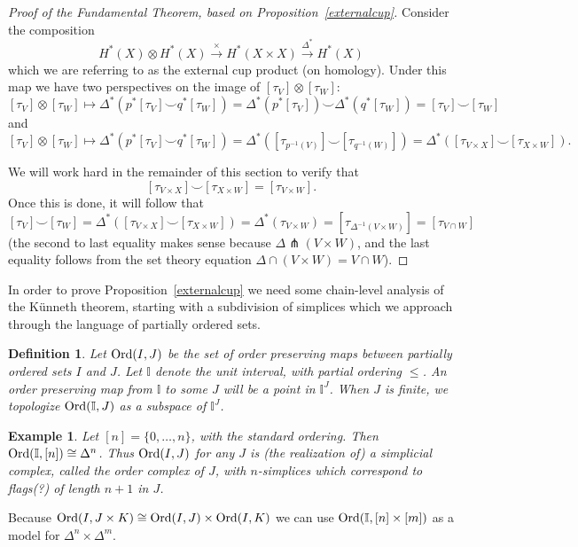 \documentclass{amsart}          %
\newtheorem{definition}[theorem]{Definition}
\newtheorem{example}[theorem]{Example}
\newcommand{\I}{\mathbb I}
\begin{document}
\begin{proof}[Proof of the Fundamental Theorem, based on Proposition~\ref{externalcup}]
Consider the composition 
\[
H^{\ast}(X)\otimes H^{\ast}(X)\xrightarrow{\times} H^{\ast}(X\times X)\xrightarrow{\Delta^*}H^{\ast}(X)
\]
which we are referring to as the external cup product (on homology). Under this map we have two perspectives on the image of $[\tau_V]\otimes[\tau_W]$:
\[
[\tau_V]\otimes[\tau_W]\mapsto \Delta^{\ast}(p^{\ast}[\tau_V]\smile q^{\ast}[\tau_W]) = \Delta^{\ast}(p^{\ast}[\tau_V])\smile\Delta^{\ast}(q^{\ast}[\tau_W]) = [\tau_V]\smile[\tau_W]
\]
and
\[
[\tau_V]\otimes[\tau_W]\mapsto \Delta^{\ast}(p^{\ast}[\tau_V]\smile q^{\ast}[\tau_W]) = \Delta^{\ast}([\tau_{p^{-1}(V)}]\smile [\tau_{q^{-1}(W)}]) = \Delta^{\ast}([\tau_{V\times X}]\smile[\tau_{X\times W}]).
\]

We will work hard in the remainder of this section to verify that 
\[
[\tau_{V\times X}]\smile[\tau_{X\times W}]= [\tau_{V\times W}].
\]
Once this is done, it will follow that
\[
[\tau_V]\smile [\tau_W] = \Delta^{\ast}([\tau_{V\times X}]\smile[\tau_{X\times W}])= \Delta^{\ast}(\tau_{V\times W}) = [\tau_{\Delta^{-1}(V\times W)}] =[\tau_{V\cap W}]
\]
(the second to last equality makes sense because $\Delta\pitchfork (V\times W)$, and the last equality follows from the set theory equation $\Delta\cap(V\times W) = V\cap W$). 


\end{proof}


In order to prove Proposition~\ref{externalcup} we need some chain-level analysis of the K\"unneth theorem, starting with 
a subdivision of simplices which we approach through the language of partially ordered sets.

\begin{definition}
Let ${\rm Ord}(I,J)$ be the set of order preserving maps between partially ordered sets $I$ and $J$.  Let $\I$ denote the unit interval,
with partial ordering $\leq$.  An order preserving map from $\I$ to some $J$ will be a point in  $\I^J$.  When $J$ is finite, we topologize
${\rm Ord}(\I, J)$ as a subspace of $\I^J$.
\end{definition}

\begin{example}
Let $[n] = \{0, \ldots, n\}$, with the standard ordering.  Then ${\rm Ord}(\I, [n]) \cong \Delta^n$.  Thus  ${\rm Ord}(I,J)$ for any $J$
is (the realization of) a simplicial complex, called the order complex of $J$, with $n$-simplices which correspond to flags(?)
of length $n + 1$ in $J$.
\end{example}

Because ${\rm Ord}(I,J \times K) \cong {\rm Ord}(I,J) \times {\rm Ord}(I,K)$ we can use ${\rm Ord}(\I,[n] \times [m])$
as a model for $\Delta^n \times \Delta^m$.   
\end{document}
